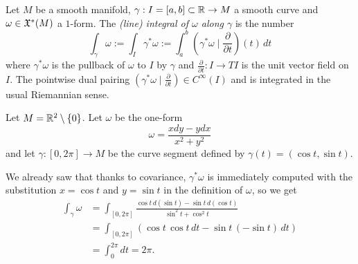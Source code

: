 \begin{definition}
  Let $M$ be a smooth manifold, $\gamma: I = [a,b]\subset \mathbb{R} \to M$ a smooth curve and $\omega\in\mathfrak{X}^*(M)$ a $1$-form.
  The \emph{(line) integral of $\omega$ along $\gamma$} is the number
  \begin{equation}
    \int_\gamma \omega :=
    \int_I \gamma^*\omega :=
    \int_a^b \left(\gamma^*\omega \mid \frac{\partial}{\partial t}\right)(t)\, dt
  \end{equation}
  where $\gamma^*\omega$ is the pullback of $\omega$ to $I$ by $\gamma$ and $\frac{\partial}{\partial t}: I \to TI$ is the unit vector field on $I$.
  The pointwise dual pairing $\left(\gamma^*\omega \mid \frac{\partial}{\partial t}\right)\in C^\infty(I)$ and is integrated in the usual Riemannian sense.
\end{definition}

\begin{example}\label{ex:li}
  Let $M=\mathbb{R}^2\setminus\{0\}$. Let $\omega$ be the one-form
  \begin{equation}
    \omega = \frac{x dy - y dx}{x^2 + y^2}
  \end{equation}
  and let $\gamma:[0,2\pi]\to M$ be the curve segment defined by $\gamma(t) = (\cos t, \sin t)$.
  
  We already saw that thanks to covariance, $\gamma^*\omega$ is immediately computed with the substitution $x=\cos t$ and $y=\sin t$ in the definition of $\omega$, so we get
  \begin{align}
    \int_\gamma \omega
    &= \int_{[0,2\pi]} \frac{\cos t\, d(\sin t) - \sin t \, d(\cos t)}{\sin^2 t + \cos^2 t} \\
    &= \int_{[0,2\pi]} (\cos t\, \cos t\, dt - \sin t \, (-\sin t)\, dt) \\
    &= \int_0^{2\pi} dt = 2\pi.
  \end{align} 
\end{example}

